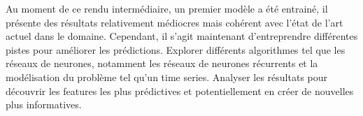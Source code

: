 Au moment de ce rendu intermédiaire, un premier modèle a été entrainé, il présente des résultats relativement médiocres
mais cohérent avec l'état de l'art actuel dans le domaine.  Cependant, il s'agit maintenant d'entreprendre différentes pistes pour améliorer les prédictions.
Explorer différents algorithmes tel que les réseaux de neurones, notamment les réseaux de neurones récurrents et la modélisation du problème tel qu'un time series.
Analyser les résultats pour découvrir les features les plus prédictives et potentiellement en créer de nouvelles plus informatives.

\vfil
\hspace{8cm}\makeatletter\@author\makeatother\par
\hspace{8cm}\begin{minipage}{5cm}
\end{minipage}
